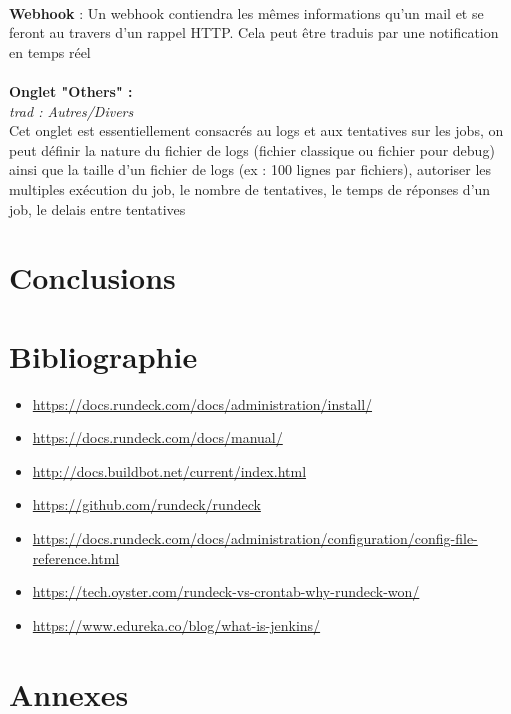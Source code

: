 \documentclass[12pt]{article}
\begin{document}
\\
\textbf{Webhook} : Un webhook contiendra les mêmes informations qu'un mail et se feront au travers d'un rappel HTTP. Cela peut être traduis par une notification en temps réel 
\\
\vspace{0.2cm}
\\
\textbf{Onglet "Others" :}
\\
\textit{trad : Autres/Divers}
\\
Cet onglet est essentiellement consacrés au logs et aux tentatives sur les jobs, on peut définir la nature du fichier de logs (fichier classique ou fichier pour debug) ainsi que la taille d'un fichier de logs (ex : 100 lignes par fichiers), autoriser les multiples exécution du job, le nombre de tentatives, le temps de réponses d'un job, le delais entre tentatives
\\
\section{Conclusions}

\newpage
\section{Bibliographie}

\begin{itemize}
    \item \url{https://docs.rundeck.com/docs/administration/install/}
    \item \url{https://docs.rundeck.com/docs/manual/}
    \item \url{http://docs.buildbot.net/current/index.html}
    \item \url{https://github.com/rundeck/rundeck}
    \item \url{https://docs.rundeck.com/docs/administration/configuration/config-file-reference.html}
    \item \url{https://tech.oyster.com/rundeck-vs-crontab-why-rundeck-won/}
    \item \url{https://www.edureka.co/blog/what-is-jenkins/}
\end{itemize}

\newpage
\section{Annexes}
\end{document}
